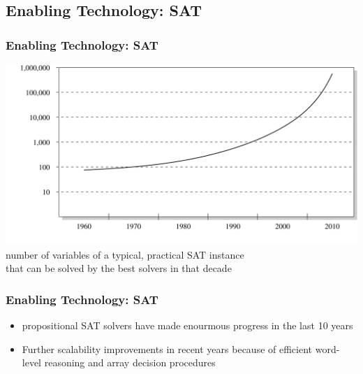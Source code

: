 
\subsection{Enabling Technology: SAT}

\begin{frame}
\frametitle{Enabling Technology: SAT}

\begin{center}
\includegraphics[width=\textwidth]{sa-sat-progress}\\
number of variables of a typical, practical SAT instance\\
that can be solved by the best solvers in that decade
\end{center}

\end{frame}


\begin{frame}
\frametitle{Enabling Technology: SAT}

\begin{itemize}

\item propositional SAT solvers have made enourmous
progress in the last 10 years
\vfill

\item Further scalability improvements in recent years
because of efficient {\color{ta3skyblue}word-level reasoning} and
{\color{ta3skyblue}array decision procedures}

\end{itemize}

\end{frame}

